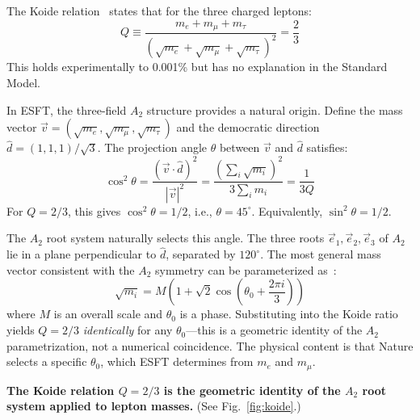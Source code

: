 ﻿\documentclass[twocolumn,preprintnumbers,amsmath,amssymb,prd]{revtex4-2}
\begin{document}
The Koide relation~\cite{Koide1983} states that for the three charged leptons:
\begin{equation}
Q \equiv \frac{m_e + m_\mu + m_\tau}{(\sqrt{m_e} + \sqrt{m_\mu} + \sqrt{m_\tau})^2} = \frac{2}{3}
\end{equation}
This holds experimentally to 0.001\% but has no explanation in the Standard Model.

In ESFT, the three-field $A_2$ structure provides a natural origin. Define the mass vector $\vec{v} = (\sqrt{m_e}, \sqrt{m_\mu}, \sqrt{m_\tau})$ and the democratic direction $\hat{d} = (1,1,1)/\sqrt{3}$. The projection angle $\theta$ between $\vec{v}$ and $\hat{d}$ satisfies:
\begin{equation}
\cos^2\theta = \frac{(\vec{v}\cdot\hat{d})^2}{|\vec{v}|^2} = \frac{(\sum_i\sqrt{m_i})^2}{3\sum_i m_i} = \frac{1}{3Q}
\label{eq:koide_angle}
\end{equation}
For $Q = 2/3$, this gives $\cos^2\theta = 1/2$, i.e., $\theta = 45^\circ$. Equivalently, $\sin^2\theta = 1/2$.

The $A_2$ root system naturally selects this angle. The three roots $\vec{e}_1, \vec{e}_2, \vec{e}_3$ of $A_2$ lie in a plane perpendicular to $\hat{d}$, separated by $120^\circ$. The most general mass vector consistent with the $A_2$ symmetry can be parameterized as~\cite{Koide1983}:
\begin{equation}
\sqrt{m_i} = M\left(1 + \sqrt{2}\cos\left(\theta_0 + \frac{2\pi i}{3}\right)\right)
\label{eq:koide_param}
\end{equation}
where $M$ is an overall scale and $\theta_0$ is a phase. Substituting into the Koide ratio yields $Q = 2/3$ \emph{identically} for any $\theta_0$---this is a geometric identity of the $A_2$ parametrization, not a numerical coincidence. The physical content is that Nature selects a specific $\theta_0$, which ESFT determines from $m_e$ and $m_\mu$.

\textbf{The Koide relation $Q = 2/3$ is the geometric identity of the $A_2$ root system applied to lepton masses.} (See Fig.~\ref{fig:koide}.)
\end{document}
